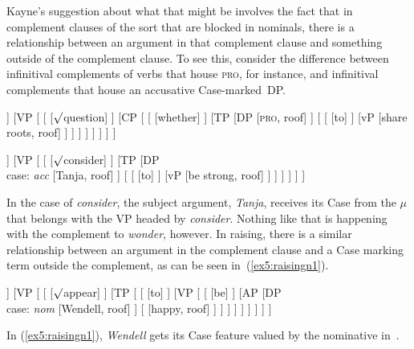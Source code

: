 Kayne's suggestion about what that might be involves the fact that in complement clauses of the sort that are blocked in nominals, there is a relationship between an argument in that complement clause and something outside of the complement clause. To see this, consider the difference between infinitival complements of verbs that house \textsc{pro}, for instance, and infinitival complements that house an accusative Case-marked~DP.
\begin{fullwidth}
\begin{exe}
	\medskip
	\raggedright
	\ex \label{ex5:contrn1} 
	\small
	\begin{forest}
	[\ibar{$\mu$}
		[\obar{$\mu$} [case: \emph{acc}] ]
		[VP [
			[ [$\surd$question] ]
			[CP [
				[ [whether] ]
				[TP
					[DP [\textsc{pro}, roof] ]
					[
						[ [to] ]
						[vP [share roots, roof] ]
					 ]
				 ]
			] ]
		] ]
	]
	\end{forest}
	\hspace*{-20pt}
	\begin{forest}
	[\ibar{$\mu$}
		[\obar{$\mu$} [case: \emph{acc}] ]
		[VP [\ibar{V}
			[ [$\surd$consider] ]
			[TP
				[DP\\ case: \emph{acc} [Tanja, roof] ]
				[\ibar{T}
					[\obar{T} [to] ]
					[vP [be strong, roof] ]
				 ]
			 ]
		] ]
	]
	\end{forest}
	\medskip
\end{exe}
\end{fullwidth}
In the case of \emph{consider}, the subject argument, \emph{Tanja}, receives its Case from the $\mu$ that belongs with the VP headed by \emph{consider}. Nothing like that is happening with the complement to \emph{wonder}, however. In raising, there is a similar relationship between an argument in the complement clause and a Case marking term outside the complement, as can be seen in~(\ref{ex5:raisingn1}).
\enlargethispage*{60pt}
\begin{exe}
	\raggedright
	\ex \label{ex5:raisingn1} 
	\small
	\begin{forest}
	[\ibar{T}
		[\obar{T} [$\bullet$case: \emph{nom}] ]
		[VP [
			[ [$\surd$appear] ]
			[TP [
				[ [to] ]
				[VP [\ibar{V}
					[\obar{V} [be] ]
					[AP
						[DP\\ case: \emph{nom} [Wendell, roof] ]
						[\ibar{A} [happy, roof] ]
					 ]
				] ]
			] ]
		] ]
	]
	\end{forest}
\end{exe}
In (\ref{ex5:raisingn1}), \emph{Wendell} gets its Case feature valued by the nominative in~. 

